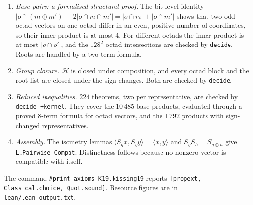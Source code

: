 \documentclass[11pt]{article}
\numberwithin{equation}{section}
\theoremstyle{definition}
\theoremstyle{remark}
\begin{document}
\begin{enumerate}
\item \emph{Base pairs: a formalised structural proof.} The bit-level identity
  $|o\cap(m\oplus m')|+2|o\cap m\cap m'|=|o\cap m|+|o\cap m'|$ shows that two odd octad vectors on one
  octad differ in an even, positive number of coordinates, so their inner product is at most $4$.
  For different octads the inner product is at most $|o\cap o'|$, and the $128^2$ octad
  intersections are checked by \texttt{decide}. Roots are handled by a two-term formula.
\item \emph{Group closure.} $\mathcal H$ is closed under composition, and every octad block and the
  root list are closed under the sign changes. Both are checked by \texttt{decide}.
\item \emph{Reduced inequalities.} $224$ theorems, two per representative, are checked by
  \texttt{decide +kernel}. They cover the $10\,485$ base products, evaluated through a proved
  $8$-term formula for octad vectors, and the $1\,792$ products with sign-changed representatives.
\item \emph{Assembly.} The isometry lemmas
  $\langle S_gx,S_gy\rangle=\langle x,y\rangle$ and $S_gS_h=S_{g\oplus h}$ give
  \texttt{L.Pairwise Compat}. Distinctness follows because no nonzero vector is compatible with
  itself.
\end{enumerate}
The command \verb|#print axioms K19.kissing19| reports \texttt{[propext, Classical.choice,
Quot.sound]}. Resource figures are in \texttt{lean/lean\_output.txt}.
\end{document}
